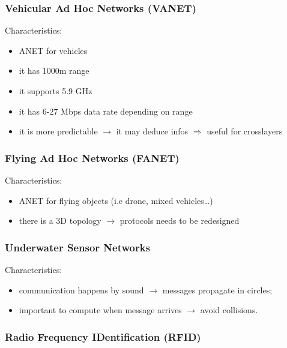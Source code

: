 \subsubsection{Vehicular Ad Hoc Networks (VANET)}

Characteristics:
\begin{itemize}
    \item ANET for vehicles
    \item it has 1000m range
    \item it supports 5.9 GHz
    \item it has 6-27 Mbps data rate depending on range
    \item it is more predictable $\rightarrow$ it may deduce infos
    $\Rightarrow$ useful for crosslayers
\end{itemize}

\subsubsection{Flying Ad Hoc Networks (FANET)}

Characteristics:
\begin{itemize}
    \item ANET for flying objects (i.e drone, mixed vehicles\dots)
    \item there is a 3D topology $\rightarrow$ protocols needs to be redesigned
\end{itemize}

\subsubsection{Underwater Sensor Networks}

Characteristics:
\begin{itemize}
    \item communication happens by sound $\rightarrow$
    messages propagate in circles;
    \item important to compute when message arrives $\rightarrow$ avoid collisions.
\end{itemize}

\subsubsection{Radio Frequency IDentification (RFID)}

